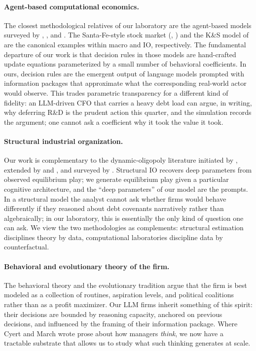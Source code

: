 \documentclass[11pt]{article}
\begin{document}
\paragraph{Agent-based computational economics.} The closest methodological
relatives of our laboratory are the agent-based models surveyed by
\citet{tesfatsion2006agent}, \citet{leijonhufvud2006agent}, and
\citet{epstein2006generative}. The Santa-Fe-style stock market
(\citealp{lebaron1999time}, \citealp{arthur1997asset}) and the K\&S model of
\citet{dosi2010schumpeter} are the canonical examples within macro and IO,
respectively. The fundamental departure of our work is that decision rules
in those models are hand-crafted update equations parameterized by a
small number of behavioral coefficients. In ours, decision rules are the
emergent output of language models prompted with information packages
that approximate what the corresponding real-world actor would observe.
This trades parametric transparency for a different kind of fidelity: an
LLM-driven CFO that carries a heavy debt load can argue, in writing, why
deferring R\&D is the prudent action this quarter, and the simulation
records the argument; one cannot ask a coefficient why it took the value
it took.

\paragraph{Structural industrial organization.} Our work is complementary
to the dynamic-oligopoly literature initiated by \citet{ericsonpakes1995},
extended by \citet{bajaribenkardlevin2007} and \citet{doraszelskipakes2007},
and surveyed by \citet{aguirregabiria2010dynamic}. Structural IO recovers
deep parameters from observed equilibrium play; we generate equilibrium
play given a particular cognitive architecture, and the
``deep parameters'' of our model are the prompts. In a structural model
the analyst cannot ask whether firms would behave differently if they
reasoned about debt covenants narratively rather than algebraically; in
our laboratory, this is essentially the only kind of question one can
ask. We view the two methodologies as complements: structural estimation
disciplines theory by data, computational laboratories discipline data by
counterfactual.

\paragraph{Behavioral and evolutionary theory of the firm.} The
\citet{cyertmarch1963} behavioral theory and the \citet{nelsonwinter1982}
evolutionary tradition argue that the firm is best modeled as a
collection of routines, aspiration levels, and political coalitions
rather than as a profit maximizer. Our LLM firms inherit something of
this spirit: their decisions are bounded by reasoning capacity, anchored
on previous decisions, and influenced by the framing of their information
package. Where Cyert and March wrote prose about how managers \emph{think},
we now have a tractable substrate that allows us to study what such
thinking generates at scale.
\end{document}
